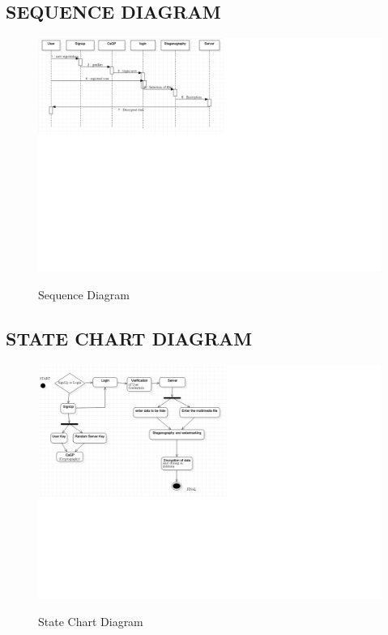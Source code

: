 \documentclass[12pt]{extreport}
\begin{document}
   \pagebreak 
    \subsection{SEQUENCE DIAGRAM}
    \begin{figure}[H]
  \centering
  \includegraphics[scale=0.75]{sequence.png}\\
  \caption{Sequence Diagram}
  
\end{figure}
 \pagebreak   
    \subsection{STATE CHART DIAGRAM}
    
    \begin{figure}[H]
  \centering
  \includegraphics[scale=0.7]{State.png}\\
  \caption{State Chart Diagram}
  
\end{figure}
\pagebreak
\end{document}
